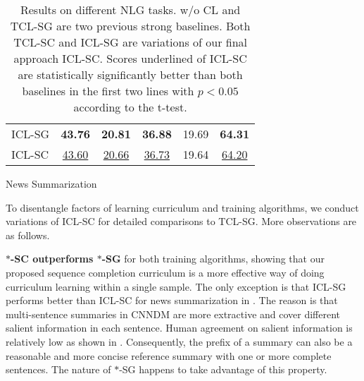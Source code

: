 \begin{table}[th!]
\begin{subtable}{\linewidth}
\begin{tabular}{lccccc}
			ICL-SG & \textbf{43.76} & \textbf{20.81} & \textbf{36.88} & 19.69 & \textbf{64.31}\\
			ICL-SC & \underline{{43.60}} & \underline{{20.66}} & \underline{{36.73}} & 19.64 & \underline{{64.20}}\\
			\hline
		\end{tabular}
		\caption{News Summarization}
		\label{tab:end2endns}
	\end{subtable}
	\caption{Results on different NLG tasks. w/o CL and TCL-SG are two previous strong baselines. 
Both TCL-SC and ICL-SG are variations of our final approach ICL-SC. Scores underlined of ICL-SC 
are statistically significantly better than both baselines in the first two lines with $p<0.05$ 
according to the t-test. }	
	\label{tab:end2end}
\end{table}
To disentangle factors of learning curriculum and training algorithms, we conduct variations of ICL-SC for detailed comparisons to TCL-SG. More observations are as follows. 

\textbf{$\ast$-SC outperforms $\ast$-SG} for both training algorithms, showing that our proposed sequence completion curriculum is a more effective way of doing curriculum learning within a single sample. 
The only exception is that ICL-SG performs better than ICL-SC for news summarization in . The reason is that multi-sentence summaries in CNNDM are more extractive and cover different salient information in each sentence. Human agreement on salient information is relatively low as shown in . Consequently, the prefix of a summary can also be a reasonable and more concise 
reference summary with one or more complete sentences. The nature of $\ast$-SG happens to take advantage
of this property.

